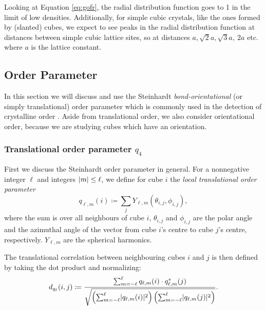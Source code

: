 \documentclass[thesis]{subfiles}
\begin{document}
Looking at Equation \ref{eq:gofr}, the radial distribution function goes to 1 in the limit of low densities. Additionally, for simple cubic crystals, like the ones formed by (slanted) cubes, we expect to see peaks in the radial distribution function at distances between simple cubic lattice sites, so at distances $a, \sqrt 2a, \sqrt 3a,\ 2a$ etc. where $a$ is the lattice constant.

\subsection{Order Parameter} \label{subsec:order}

In this section we will discuss and use the Steinhardt \emph{bond-orientational} (or simply translational) order parameter which is commonly used in the detection of crystalline order \cite{steinhardt1983bond, lechner2008accurate, van2017phase, sharma2018disorder, mickel2013shortcomings}. Aside from translational order, we also consider orientational order, because we are studying cubes which have an orientation.

\subsubsection{Translational order parameter \texorpdfstring{$q_4$}{q4}}

First we discuss the Steinhardt order parameter in general. For a nonnegative integer $\ell$ and integers $\lvert m\rvert \leq\ell$, we define for cube $i$ the \emph{local translational order parameter}
\begin{equation}
q_{\ell, m}(i) \coloneqq \sum_{j} Y_{\ell, m} (\theta_{i, j}, \phi_{i, j}),
\end{equation}
where the sum is over all neighbours of cube $i$, $\theta_{i, j}$ and $\phi_{i, j}$ are the polar angle and the azimuthal angle of the vector from cube $i$'s centre to cube $j$'s centre, respectively. $Y_{\ell, m}$ are the spherical harmonics.%

The translational correlation between neighbouring cubes $i$ and $j$ is then defined by taking the dot product and normalizing:
\begin{equation}
d_{q_\ell}(i, j) \coloneqq \frac{\sum_{m = -\ell}^\ell q_{\ell, m}(i) \cdot q^*_{\ell, m}(j)}{\sqrt{\left(\sum_{m = -\ell}^\ell \lvert q_{\ell, m}(i)\rvert^2\right) \left(\sum_{m = -\ell}^\ell \lvert q_{\ell, m}(j)\rvert^2\right)}}.
\end{equation}
\end{document}
